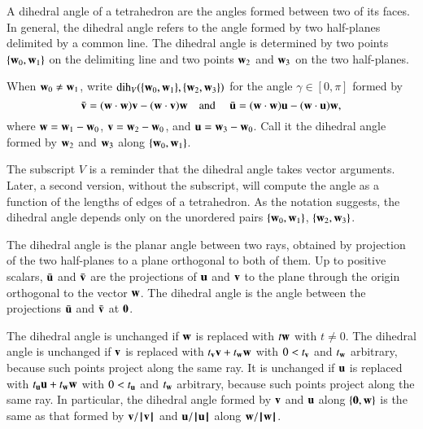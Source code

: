 A dihedral angle of a tetrahedron are the angles formed between two of
its faces. In general, the dihedral angle refers to the angle formed
by two half-planes delimited by a common line.  The dihedral angle is
determined by two points $\{{\mathbf w}_0,{\mathbf w}_1\}$ on the delimiting line and
two points ${\mathbf w}_2$ and ${\mathbf w}_3$ on the two half-planes.
%
%
%
%
%

\begin{definition}\label{def:dih}
 When ${\mathbf w}_0\ne {\mathbf w}_1$,
  write $\operatorname{dih}_V(\{{\mathbf w}_0,{\mathbf w}_1\},\{{\mathbf w}_2,{\mathbf w}_3\})$ for the angle
  $\gamma\in[0,\pi]$ formed by
\begin{displaymath}
\bar {{\mathbf v}} = ({\mathbf w}\cdot {\mathbf w}) {\mathbf v} - ({\mathbf w}\cdot {\mathbf v}) {\mathbf w}\quad\text{and }\quad \bar {{\mathbf u}} =
({\mathbf w}\cdot {\mathbf w}) {\mathbf u} - ({\mathbf w}\cdot {\mathbf u}) {\mathbf w},
\end{displaymath}
where ${\mathbf w}={\mathbf w}_1-{\mathbf w}_0$, ${\mathbf v} = {\mathbf w}_2-{\mathbf w}_0$,  and ${\mathbf u}={\mathbf w}_3-{\mathbf w}_0$.  Call it
the dihedral angle formed by ${\mathbf w}_2$ and ${\mathbf w}_3$ along $\{{\mathbf w}_0,{\mathbf w}_1\}$.
%
%
\end{definition}
The subscript $V$ is a reminder 
that the dihedral angle takes vector arguments.
Later, a second version, without the subscript, will
compute the angle as a function of the lengths of edges of a 
tetrahedron.
%
%
As the notation suggests, the dihedral angle depends only
on the unordered pairs $\{{\mathbf w}_0,{\mathbf w}_1\}$, $\{{\mathbf w}_2,{\mathbf w}_3\}$.

The dihedral angle is the planar angle between two rays, obtained by
projection of the two half-planes to a plane orthogonal to both of
them.  Up to positive scalars, $\bar {{\mathbf u}}$ and $\bar {{\mathbf v}}$ are the
projections of ${\mathbf u}$ and ${\mathbf v}$ to the plane through the origin
orthogonal to the vector ${\mathbf w}$.  The dihedral angle is the angle
between the projections $\bar {{\mathbf u}}$ and $\bar {{\mathbf v}}$ at ${\mathbf 0}$.

\begin{remark}\label{rem:dih}
  The dihedral angle is unchanged if ${\mathbf w}$ is replaced with $t {\mathbf w}$ with
  $t\ne0$. The dihedral angle is unchanged if ${\mathbf v}$ is replaced with
  $t_{\mathbf v} {\mathbf v} + t_{\mathbf w} {\mathbf w}$ with $0 < t_{\mathbf v}$ and $t_{\mathbf w}$ arbitrary, because
  such points project along the same ray.  It is unchanged if ${\mathbf u}$ is
  replaced with $t_{\mathbf u} {\mathbf u} + t_{\mathbf w} {\mathbf w}$ with $0 < t_{\mathbf u}$ and $t_{\mathbf w}$
  arbitrary, because such points project along the same ray.  In
  particular, the dihedral angle formed by ${\mathbf v}$ and ${\mathbf u}$ along
  $\{{\mathbf 0},{\mathbf w}\}$ is the same as that formed by ${\mathbf v}/{{\hskip0.1em|\hskip-0.15em|\hskip0.1em}{\mathbf v}{\hskip0.1em|\hskip-0.15em|\hskip0.1em}}$ and
  ${\mathbf u}/{{\hskip0.1em|\hskip-0.15em|\hskip0.1em}{\mathbf u}{\hskip0.1em|\hskip-0.15em|\hskip0.1em}}$ along ${\mathbf w}/{{\hskip0.1em|\hskip-0.15em|\hskip0.1em}{\mathbf w}{\hskip0.1em|\hskip-0.15em|\hskip0.1em}}$.
\end{remark}

